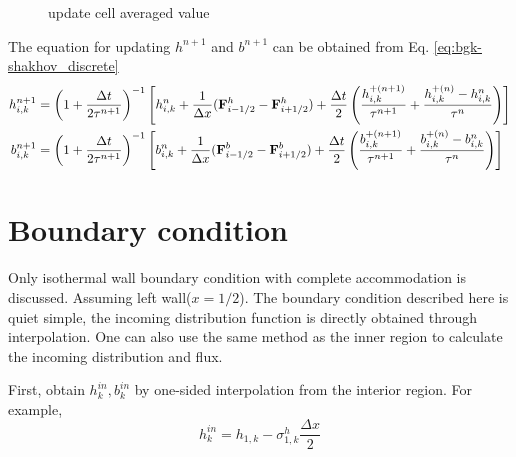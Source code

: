 \documentclass[a4paper]{book}
\begin{document}
\begin{figure}[htb!]
    \centering
    \caption{update cell averaged value}
    \label{pic:update}
\end{figure}

The equation for updating $h^{n+1}$ and $b^{n+1}$ can be obtained from Eq. \ref{eq:bgk-shakhov_discrete}
$$
\begin{aligned}
    h_{i,k}^{n+1} &= \left(1+\frac{\Delta t}{2\tau^{n+1}}\right)^{-1}\left[h_{i,k}^n+\frac{1}{\Delta x}({\bf F}_{i-1/2}^h-{\bf F}_{i+1/2}^h)+\frac{\Delta t}{2}\left(\frac{h_{i,k}^{+(n+1)}}{\tau^{n+1}}+\frac{h_{i,k}^{+(n)}-h_{i,k}^n}{\tau^n}\right)\right]\\
    b_{i,k}^{n+1} &= \left(1+\frac{\Delta t}{2\tau^{n+1}}\right)^{-1}\left[b_{i,k}^n+\frac{1}{\Delta x}({\bf F}_{i-1/2}^b-{\bf F}_{i+1/2}^b)+\frac{\Delta t}{2}\left(\frac{b_{i,k}^{+(n+1)}}{\tau^{n+1}}+\frac{b_{i,k}^{+(n)}-b_{i,k}^n}{\tau^n}\right)\right]\\
\end{aligned} 
$$

\section{Boundary condition}
Only isothermal wall boundary condition with complete accommodation is discussed. Assuming left wall($x=1/2$). The boundary condition described here is quiet simple, the incoming distribution function is directly obtained through interpolation. One can also use the same method as the inner region to calculate the incoming distribution and flux.

First, obtain $h_k^{in},b_k^{in}$ by one-sided interpolation from the interior region. For example,
$$h_{k}^{in} = h_{1,k}-\sigma_{1,k}^h\frac{\Delta x}{2}$$
\end{document}
